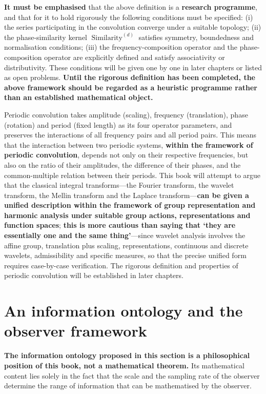 \textbf{It must be emphasised} that the above definition is a \textbf{research programme}, and that for it to hold rigorously the following conditions must be specified: (i) the series participating in the convolution converge under a suitable topology; (ii) the phase-similarity kernel $\operatorname{Similarity}^{(d)}$ satisfies symmetry, boundedness and normalisation conditions; (iii) the frequency-composition operator and the phase-composition operator are explicitly defined and satisfy associativity or distributivity. These conditions will be given one by one in later chapters or listed as open problems. \textbf{Until the rigorous definition has been completed, the above framework should be regarded as a heuristic programme rather than an established mathematical object.}

Periodic convolution takes amplitude (scaling), frequency (translation), phase (rotation) and period (fixed length) as its four operator parameters, and preserves the interactions of all frequency pairs and all period pairs. This means that the interaction between two periodic systems, \textbf{within the framework of periodic convolution}, depends not only on their respective frequencies, but also on the ratio of their amplitudes, the difference of their phases, and the common-multiple relation between their periods. This book will attempt to argue that the classical integral transforms---the Fourier transform, the wavelet transform, the Mellin transform and the Laplace transform---\textbf{can be given a unified description within the framework of group representation and harmonic analysis under suitable group actions, representations and function spaces}; \textbf{this is more cautious than saying that `they are essentially one and the same thing'}---since wavelet analysis involves the affine group, translation plus scaling, representations, continuous and discrete wavelets, admissibility and specific measures, so that the precise unified form requires case-by-case verification. The rigorous definition and properties of periodic convolution will be established in later chapters.

\section*{An information ontology and the observer framework}

\textbf{The information ontology proposed in this section is a philosophical position of this book, not a mathematical theorem.} Its mathematical content lies solely in the fact that the scale and the sampling rate of the observer determine the range of information that can be mathematised by the observer.

